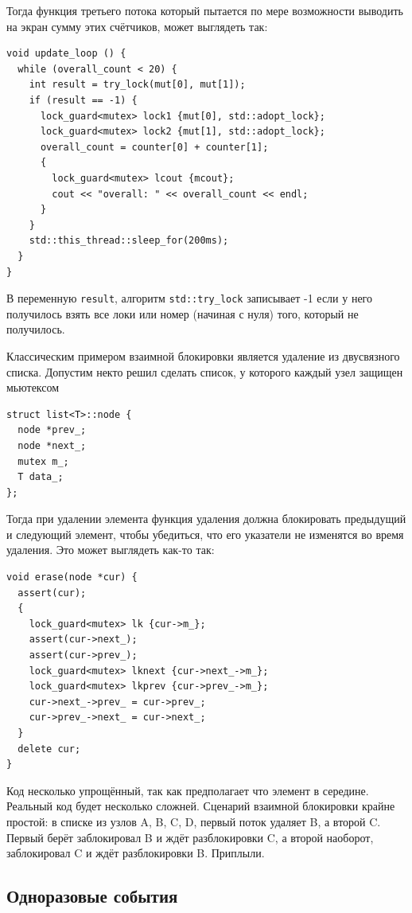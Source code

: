 \documentclass[a4paper,12pt,oneside]{book}
\begin{document}
Тогда функция третьего потока который пытается по мере возможности выводить на экран сумму этих счётчиков, может выглядеть так:

\begin{lstlisting}
void update_loop () {
  while (overall_count < 20) {
    int result = try_lock(mut[0], mut[1]); 
    if (result == -1) {
      lock_guard<mutex> lock1 {mut[0], std::adopt_lock};
      lock_guard<mutex> lock2 {mut[1], std::adopt_lock};
      overall_count = counter[0] + counter[1];
      {
        lock_guard<mutex> lcout {mcout};
        cout << "overall: " << overall_count << endl;
      }
    }
    std::this_thread::sleep_for(200ms);
  }
}
\end{lstlisting}

В переменную \lstinline!result!, алгоритм \lstinline!std::try_lock! записывает -1 если у него получилось взять все локи или номер (начиная с нуля) того, который не получилось.

Классическим примером взаимной блокировки является удаление из двусвязного списка. Допустим некто решил сделать список, у которого каждый узел защищен мьютексом

\begin{lstlisting}
struct list<T>::node {
  node *prev_;
  node *next_;
  mutex m_;
  T data_;
};
\end{lstlisting}

Тогда при удалении элемента функция удаления должна блокировать предыдущий и следующий элемент, чтобы убедиться, что его указатели не изменятся во время удаления. Это может выглядеть как-то так:

\begin{lstlisting}
void erase(node *cur) {
  assert(cur);
  {
    lock_guard<mutex> lk {cur->m_};
    assert(cur->next_);
    assert(cur->prev_);
    lock_guard<mutex> lknext {cur->next_->m_};
    lock_guard<mutex> lkprev {cur->prev_->m_};
    cur->next_->prev_ = cur->prev_;
    cur->prev_->next_ = cur->next_;
  }
  delete cur;
}
\end{lstlisting}

Код несколько упрощённый, так как предполагает что элемент в середине. Реальный код будет несколько сложней. Сценарий взаимной блокировки крайне простой: в списке из узлов A, B, C, D, первый поток удаляет B, а второй C. Первый берёт заблокировал B и ждёт разблокировки C, а второй наоборот, заблокировал C и ждёт разблокировки B. Приплыли.

\subsection{Одноразовые события}\label{sub:callonce}
\end{document}
